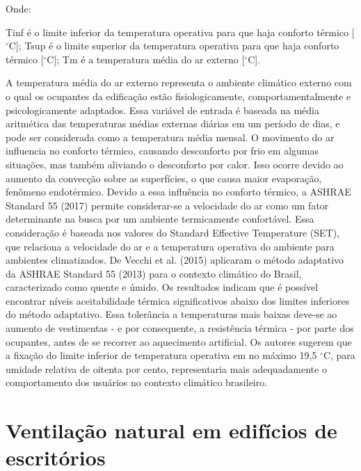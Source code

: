 \documentclass[brazil,hardcopy,openany,a5paper]{ufscthesis}
\begin{document}
	Onde:
	
	Tinf é o limite inferior da temperatura operativa para que haja conforto térmico [$^{\circ}$C];
	Tsup é o limite superior da temperatura operativa para que haja conforto térmico [$^{\circ}$C];
	Tm é a temperatura média do ar externo [$^{\circ}$C].
	
	A temperatura média do ar externo representa o ambiente climático externo com o qual os ocupantes da edificação estão fisiologicamente,
	comportamentalmente e psicologicamente adaptados. Essa variável de entrada é baseada na média aritmética das temperaturas médias externas diárias em um período de dias, e pode ser considerada como a temperatura média mensal.
	O movimento do ar influencia no conforto térmico, causando desconforto por frio em algumas situações, mas também aliviando o desconforto por calor.
	Isso ocorre devido ao aumento da convecção sobre as superfícies, o que causa maior evaporação, fenômeno endotérmico. Devido a essa influência no conforto térmico, a ASHRAE Standard 55 (2017) permite considerar-se a velocidade do ar como um fator determinante na busca por um ambiente termicamente confortável. Essa consideração é baseada nos valores do Standard Effective Temperature (SET), que relaciona a velocidade do ar e a temperatura operativa do ambiente para ambientes climatizados.
	De Vecchi et al. (2015) aplicaram o método adaptativo da ASHRAE Standard 55 (2013) para o contexto climático do Brasil, caracterizado como quente e úmido. Os resultados indicam que é possível encontrar níveis aceitabilidade térmica significativos abaixo dos limites inferiores do método adaptativo. Essa tolerância a temperaturas mais baixas deve-se ao aumento de vestimentas - e por consequente, a resistência térmica - por parte dos ocupantes, antes de se recorrer ao aquecimento artificial. Os autores sugerem que a fixação do limite inferior de temperatura operativa em no máximo 19,5 $^{\circ}$C, para umidade relativa de oitenta por cento, representaria mais adequadamente o comportamento dos usuários no contexto climático brasileiro.
	
	\section{Ventilação natural em edifícios de escritórios}
	
\end{document}
